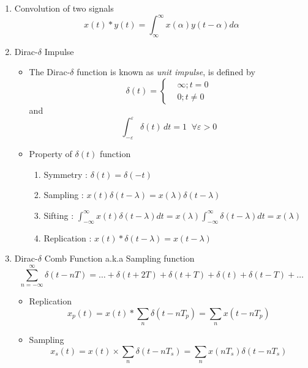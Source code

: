 \begin{enumerate}
\begin{figure}[h]
        \label{fig:enter-label}
    \end{figure}
    \item Convolution of two signals
    \begin{equation}
        x(t)*y(t) = \int^{\infty}_{\infty}x(\alpha)y(t-\alpha)d\alpha
    \end{equation}
    \newpage
    \item Dirac-$\delta$ Impulse
    \begin{itemize}
        \item The Dirac-$\delta$ function is known as \textit{unit impulse}, is defined by
        \begin{equation}
            \delta(t) = 
            \begin{cases}
                & \infty ; t = 0\\
                & 0      ; t \neq 0
            \end{cases}
        \end{equation}
    and 
    \begin{equation}
        \int^{\varepsilon}_{-\varepsilon}\delta(t)\, dt = 1 \;\; \forall\varepsilon > 0
    \end{equation}
    \item Property of $\delta(t)$ function
        \begin{enumerate}
            \item Symmetry : $\delta(t) = \delta(-t)$
            \item Sampling : $x(t)\delta(t-\lambda) = x(\lambda)\delta(t-\lambda)$
            \item Sifting : $\int^{\infty}_{-\infty}x(t)\delta(t-\lambda)dt = x(\lambda)\int^{\infty}_{-\infty}\delta(t-\lambda)dt = x(\lambda)$
            \item Replication : $x(t)*\delta(t-\lambda) = x(t-\lambda)$
        \end{enumerate}
    \end{itemize}
    \item Dirac-$\delta$ Comb Function a.k.a Sampling function
    \begin{equation}
        \sum^{\infty}_{n=-\infty}\delta(t-nT) = \dots + \delta(t+2T)+\delta(t+T)+\delta(t)+\delta(t-T)+\dots
    \end{equation}
    \begin{itemize}
        \item Replication
            \[x_p(t) = x(t)*\sum_{n}\delta(t-nT_p) = \sum_n x(t- nT_p)\]
        \item Sampling
            \[x_s(t) = x(t)\times\sum_n\delta(t-nT_s)=\sum_n x(nT_s)\delta(t - nT_s)\]
    \end{itemize}
\end{enumerate}

